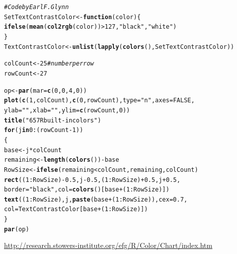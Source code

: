 \documentclass[12pt]{beamer}\usepackage[]{graphicx}\usepackage[]{color}
\makeatletter
\newcommand{\hlnum}[1]{\textcolor[rgb]{0.686,0.059,0.569}{#1}}%
\newcommand{\hlstr}[1]{\textcolor[rgb]{0.192,0.494,0.8}{#1}}%
\newcommand{\hlcom}[1]{\textcolor[rgb]{0.678,0.584,0.686}{\textit{#1}}}%
\newcommand{\hlopt}[1]{\textcolor[rgb]{0,0,0}{#1}}%
\newcommand{\hlstd}[1]{\textcolor[rgb]{0.345,0.345,0.345}{#1}}%
\newcommand{\hlkwa}[1]{\textcolor[rgb]{0.161,0.373,0.58}{\textbf{#1}}}%
\newcommand{\hlkwb}[1]{\textcolor[rgb]{0.69,0.353,0.396}{#1}}%
\newcommand{\hlkwc}[1]{\textcolor[rgb]{0.333,0.667,0.333}{#1}}%
\newcommand{\hlkwd}[1]{\textcolor[rgb]{0.737,0.353,0.396}{\textbf{#1}}}%
\newenvironment{kframe}{%
 \def\at@end@of@kframe{}%
 \ifinner\ifhmode%
  \def\at@end@of@kframe{\end{minipage}}%
  \begin{minipage}{\columnwidth}%
 \fi\fi%
 \def\FrameCommand##1{\hskip\@totalleftmargin \hskip-\fboxsep
 \colorbox{shadecolor}{##1}\hskip-\fboxsep
     \hskip-\linewidth \hskip-\@totalleftmargin \hskip\columnwidth}%
 \MakeFramed {\advance\hsize-\width
   \@totalleftmargin\z@ \linewidth\hsize
   \@setminipage}}%
 {\par\unskip\endMakeFramed%
 \at@end@of@kframe}
\newenvironment{knitrout}{}{} %
\makeatother
\begin{document}
\begin{frame}[fragile]
\begin{knitrout}\tiny
{}\color{fgcolor}\begin{kframe}
\begin{alltt}
\hlcom{# Code by Earl F. Glynn}
\hlstd{SetTextContrastColor} \hlkwb{<-} \hlkwa{function}\hlstd{(}\hlkwc{color}\hlstd{) \{}
  \hlkwd{ifelse}\hlstd{(} \hlkwd{mean}\hlstd{(}\hlkwd{col2rgb}\hlstd{(color))} \hlopt{>} \hlnum{127}\hlstd{,} \hlstr{"black"}\hlstd{,} \hlstr{"white"}\hlstd{)}
\hlstd{\}}
\hlstd{TextContrastColor} \hlkwb{<-} \hlkwd{unlist}\hlstd{(}\hlkwd{lapply}\hlstd{(}\hlkwd{colors}\hlstd{(), SetTextContrastColor))}

\hlstd{colCount} \hlkwb{<-} \hlnum{25} \hlcom{# number per row}
\hlstd{rowCount} \hlkwb{<-} \hlnum{27}

\hlstd{op} \hlkwb{<-} \hlkwd{par}\hlstd{(}\hlkwc{mar} \hlstd{=} \hlkwd{c}\hlstd{(}\hlnum{0}\hlstd{,} \hlnum{0}\hlstd{,} \hlnum{4}\hlstd{,} \hlnum{0}\hlstd{))}
\hlkwd{plot}\hlstd{(}\hlkwd{c}\hlstd{(}\hlnum{1}\hlstd{, colCount),} \hlkwd{c}\hlstd{(}\hlnum{0}\hlstd{, rowCount),} \hlkwc{type} \hlstd{=} \hlstr{"n"}\hlstd{,} \hlkwc{axes}\hlstd{=}\hlnum{FALSE}\hlstd{,}
     \hlkwc{ylab} \hlstd{=} \hlstr{""}\hlstd{,} \hlkwc{xlab} \hlstd{=} \hlstr{""}\hlstd{,} \hlkwc{ylim} \hlstd{=} \hlkwd{c}\hlstd{(rowCount,} \hlnum{0}\hlstd{))}
\hlkwd{title}\hlstd{(}\hlstr{"657 R built-in colors"}\hlstd{)}
\hlkwa{for} \hlstd{(j} \hlkwa{in} \hlnum{0}\hlopt{:}\hlstd{(rowCount}\hlopt{-}\hlnum{1}\hlstd{))}
\hlstd{\{}
  \hlstd{base} \hlkwb{<-} \hlstd{j} \hlopt{*} \hlstd{colCount}
  \hlstd{remaining} \hlkwb{<-} \hlkwd{length}\hlstd{(}\hlkwd{colors}\hlstd{())} \hlopt{-} \hlstd{base}
  \hlstd{RowSize} \hlkwb{<-} \hlkwd{ifelse}\hlstd{(remaining} \hlopt{<} \hlstd{colCount, remaining, colCount)}
  \hlkwd{rect}\hlstd{((}\hlnum{1}\hlopt{:}\hlstd{RowSize)}\hlopt{-}\hlnum{0.5}\hlstd{, j}\hlopt{-}\hlnum{0.5}\hlstd{, (}\hlnum{1}\hlopt{:}\hlstd{RowSize)}\hlopt{+}\hlnum{0.5}\hlstd{, j}\hlopt{+}\hlnum{0.5}\hlstd{,}
       \hlkwc{border} \hlstd{=} \hlstr{"black"}\hlstd{,} \hlkwc{col} \hlstd{=} \hlkwd{colors}\hlstd{()[base} \hlopt{+} \hlstd{(}\hlnum{1}\hlopt{:}\hlstd{RowSize)])}
  \hlkwd{text}\hlstd{((}\hlnum{1}\hlopt{:}\hlstd{RowSize), j,} \hlkwd{paste}\hlstd{(base} \hlopt{+} \hlstd{(}\hlnum{1}\hlopt{:}\hlstd{RowSize)),} \hlkwc{cex} \hlstd{=} \hlnum{0.7}\hlstd{,}
       \hlkwc{col} \hlstd{= TextContrastColor[base} \hlopt{+} \hlstd{(}\hlnum{1}\hlopt{:}\hlstd{RowSize)])}
\hlstd{\}}
\hlkwd{par}\hlstd{(op)}
\end{alltt}
\end{kframe}
\end{knitrout}

{\scriptsize \url{http://research.stowers-institute.org/efg/R/Color/Chart/index.htm}}

\end{frame}
\end{document}
